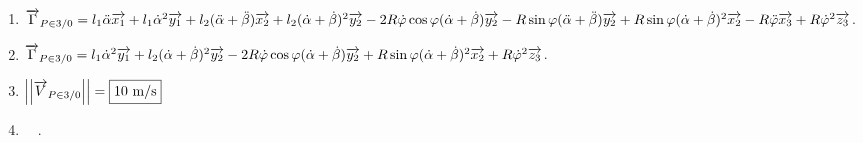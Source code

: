 \documentclass[10pt,fleqn]{article} %
\begin{document}
\begin{multicols}{2}
\begin{enumerate}
\item $\overrightarrow{\Gamma}_{P \in 3 / 0}=l_1 \ddot\alpha\overrightarrow{x_{1}}+l_1 \dot\alpha^2\overrightarrow{y_{1}} + l_2(\ddot\alpha + \ddot\beta)\overrightarrow{x_2}+ l_2(\dot\alpha+\dot\beta)^2\overrightarrow{y_2}-2R\dot\varphi\cos\varphi(\dot\alpha+\dot\beta)\overrightarrow{y_2} -R\sin\varphi(\ddot\alpha+\ddot\beta)\overrightarrow{y_2}+R\sin\varphi(\dot\alpha+\dot\beta)^2\overrightarrow{x_2}-R\ddot\varphi\overrightarrow{x_3} +R\dot\varphi^2\overrightarrow{z_3}$.

\item ${\overrightarrow{\Gamma}_{P \in 3 / 0}}=l_1 \dot\alpha^2\overrightarrow{y_1} + l_2(\dot\alpha+\dot\beta)^2\overrightarrow{y_2}-2R\dot\varphi\cos\varphi(\dot\alpha+\dot\beta)\overrightarrow{y_2}+ R\sin\varphi(\dot\alpha+\dot\beta)^2\overrightarrow{x_2} +R\dot\varphi^2\overrightarrow{z_3}$.

\item $\left|\left|\overrightarrow{V}_{P\in 3 / 0}\right|\right|=\boxed{10\text{ m/s}}$

\item $ \quad$.

\end{enumerate}


\ifprof
\else
\end{multicols}
\fi


\end{document}
